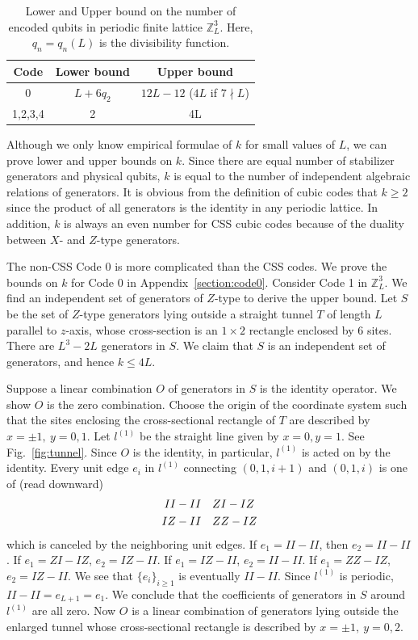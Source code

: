 \documentclass[letterpaper,10pt,pra,aps,showpacs,twocolumn]{revtex4-1}
\theoremstyle{definition} \newtheorem{defn}{Definition}
\theoremstyle{definition} \newtheorem{remark}{Remark}
\begin{document}
\begin{table}
\centering
\begin{tabular}{c|c|c}
\hline
Code & Lower bound & Upper bound \\
\hline
0 & $L + 6 q_2 $ & $12L -12$ ($4L$ if $ 7 \nmid L $) \\
1,2,3,4 & 2 & 4L \\
\hline
\end{tabular}
\caption{Lower and Upper bound on the number of encoded qubits in periodic finite lattice $\mathbb{Z}_L^3$. Here, $q_n=q_n(L)$ is the divisibility function.}
\label{tb:lower_upper_bound_k}
\end{table}

Although we only know empirical formulae of $k$ for small values of $L$, we can prove lower and upper bounds on $k$. Since there are equal number of stabilizer generators and physical qubits, $k$ is equal to the number of independent algebraic relations of generators. It is obvious from the definition of cubic codes that $k \geq 2$ since the product of all generators is the identity in any periodic lattice. In addition, $k$ is always an even number for CSS cubic codes because of the duality between $X$- and $Z$-type generators.

The non-CSS Code 0 is more complicated than the CSS codes. We prove the bounds on $k$ for Code 0 in Appendix~\ref{section:code0}. Consider Code 1 in $\mathbb{Z}_L^3$. We find an independent set of generators of $Z$-type to derive the upper bound. Let $S$ be the set of $Z$-type generators lying outside a straight tunnel $T$ of length $L$ parallel to $z$-axis, whose cross-section is an $1 \times 2$ rectangle enclosed by 6 sites. There are $L^3 - 2L$ generators in $S$. We claim that $S$ is an independent set of generators, and hence $k \leq 4 L$.

Suppose a linear combination $O$ of generators in $S$ is the identity operator. We show $O$ is the zero combination. Choose the origin of the coordinate system such that the sites enclosing the cross-sectional rectangle of $T$ are described by $ x = \pm 1, ~ y=0,1 $. Let $l^{(1)}$ be the straight line given by $ x=0, y=1 $. See Fig.~\ref{fig:tunnel}. Since $O$ is the identity, in particular, $l^{(1)}$ is acted on by the identity. Every unit edge $e_i$ in $l^{(1)}$ connecting $(0,1,i+1)$ and $(0,1,i)$ is one of (read downward)
\begin{align}
 II &- II & &
 ZI - IZ  \notag \\
 IZ &- II & &
 ZZ - IZ \label{eq:action_generator_unit_edge_code_1}
\end{align}
which is canceled by the neighboring unit edges. If $e_1 = II-II$, then $e_2= II-II$. If $e_1 = ZI-IZ$, $e_2 = IZ-II$. If $e_1 = IZ-II$, $e_2=II-II$. If $e_1 = ZZ-IZ$, $e_2 = IZ - II$. We see that $\{ e_i \}_{i \geq 1}$ is eventually $II-II$. Since $l^{(1)}$ is periodic, $II-II = e_{L+1} = e_1$. We conclude that the coefficients of generators in $S$ around $l^{(1)}$ are all zero. Now $O$ is a linear combination of generators lying outside the enlarged tunnel whose cross-sectional rectangle is described by $x = \pm 1, ~ y = 0,2 $.
\end{document}
